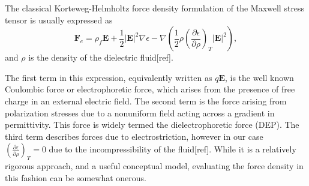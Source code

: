 \documentclass[a4paper, 12pt]{article}
\begin{document}
The classical Korteweg-Helmholtz force density formulation of the Maxwell stress tensor is usually expressed as 
\begin{equation}
\mathbf{F}_e = \rho_f \mathbf{E} + \frac{1}{2} \left| \mathbf{E} \right|^2 \nabla \epsilon - \nabla \left( \frac{1}{2} \rho \left( \frac{\partial \epsilon}{\partial \rho} \right)_T \left| \mathbf{E} \right|^2 \right) ,
\end{equation}
and $\rho$ is the density of the dielectric fluid[ref].

The first term in this expression, equivalently written as $q\mathbf{E}$, is the well known Coulombic force or electrophoretic force, which arises from the presence of free charge in an external electric field. The second term is the force arising from polarization stresses due to a nonuniform field acting across a gradient in permittivity. This force is widely termed the dielectrophoretic force (DEP). The third term describes forces due to electrostriction, however in our case $\left( \frac{\partial \epsilon}{\partial \rho} \right)_T = 0$ due to the  incompressibility of the fluid[ref]. While it is a relatively rigorous approach, and a useful conceptual model, evaluating the force density in this fashion can be somewhat onerous. 
\end{document}

